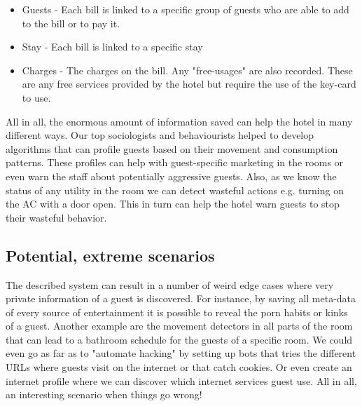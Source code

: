 \begin{itemize}
	\item Guests - Each bill is linked to a specific group of guests who are able to add to the bill or to pay it.
	\item Stay - Each bill is linked to a specific stay
	\item Charges - The charges on the bill. Any "free-usages" are also recorded. These are any free services provided by the hotel but require the use of the key-card to use.
\end{itemize}

All in all, the enormous amount of information saved can help the hotel in many different ways. Our top sociologists and behaviourists helped to develop algorithms that can profile guests based on their movement and consumption patterns. These profiles can help with guest-specific marketing in the rooms or even warn the staff about potentially aggressive guests. Also, as we know the status of any utility in the room we can detect wasteful actions e.g. turning on the AC with a door open. This in turn can help the hotel warn guests to stop their wasteful behavior.

\subsection{Potential, extreme scenarios}
\label{sec:extreme_scen}
The described system can result in a number of weird edge cases where very private information of a guest is discovered. For instance, by saving all meta-data of every source of entertainment it is possible to reveal the porn habits or kinks of a guest. Another example are the movement detectors in all parts of the room that can lead to a bathroom schedule for the guests of a specific room. We could even go as far as to "automate hacking" by setting up bots that tries the different URLs where guests visit on the internet or that catch cookies. Or even create an internet profile where we can discover which internet services guest use. All in all, an interesting scenario when things go wrong!


